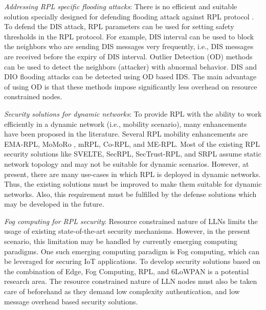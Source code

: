 \documentclass[10pt,journal,sort & compress]{IEEEtran}
\begin{document}
\textit{Addressing RPL specific flooding attacks}: There is no efficient and suitable solution specially designed for defending flooding attack against RPL protocol \cite{Mayzaud2016Taxanomy}. To defend the DIS attack, RPL parameters can be used for setting safety thresholds in the RPL protocol. For example, DIS interval can be used to block the neighbors who are sending DIS messages very frequently, i.e., DIS messages are received before the expiry of DIS interval. Outlier Detection (OD) methods can be used to detect the neighbors (attacker) with abnormal behavior. DIS and DIO flooding attacks can be detected using OD based IDS. The main advantage of using OD is that these methods impose significantly less overhead on resource constrained nodes. 

\textit{Security solutions for dynamic networks}: To provide RPL with the ability to work efficiently in a dynamic network (i.e., mobility scenario), many enhancements have been proposed in the literature. Several RPL mobility enhancements are EMA-RPL, MoMoRo , mRPL, Co-RPL, and ME-RPL. Most of the existing RPL security solutions like SVELTE, SecRPL, SecTrust-RPL, and SRPL assume static network topology and may not be suitable for dynamic scenarios. However, at present, there are many use-cases in which RPL is deployed in dynamic networks. Thus, the existing solutions must be improved to make them suitable for dynamic networks. Also, this requirement must be fulfilled by the defense solutions which may be developed in the future.  

\textit{Fog computing for RPL security}: Resource constrained nature of LLNs limits the usage of existing state-of-the-art security mechanisms. However, in the present scenario, this limitation may be handled by currently emerging computing paradigms. One such emerging computing paradigm is Fog computing, which can be leveraged for securing IoT applications. To develop security solutions based on the combination of Edge, Fog Computing, RPL, and $ 6 $LoWPAN is a potential research area. The resource constrained nature of LLN nodes must also be taken care of beforehand as they demand low complexity authentication, and low message overhead based security solutions.       
\end{document}
